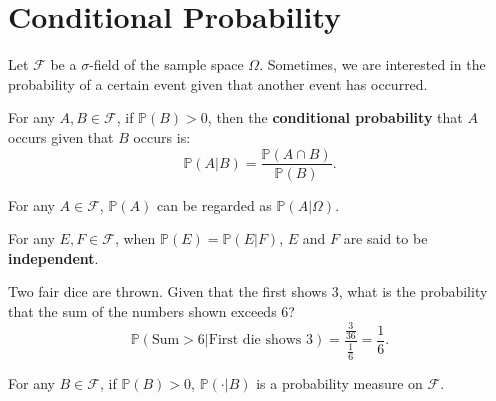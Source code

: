 \documentclass{huhtakm-template-book-v2}
\newcommand{\prob}{\mathbb{P}}
\begin{document}
\section{Conditional Probability}
    Let $\mathcal{F}$ be a $\sigma$-field of the sample space $\Omega$. Sometimes, we are interested in the probability of a certain event given that another event has occurred.
    \begin{defn}
        For any $A,B \in \mathcal{F}$, if $\prob(B) > 0$, then the \textbf{conditional probability} that $A$ occurs given that $B$ occurs is:
        \begin{equation*}
            \prob(A|B) = \frac{\prob(A\cap B)}{\prob(B)}.
        \end{equation*}
    \end{defn}
    \begin{rem}
        For any $A \in \mathcal{F}$, $\prob(A)$ can be regarded as $\prob(A|\Omega)$.
    \end{rem}
    \begin{rem}
        For any $E,F \in \mathcal{F}$, when $\prob(E) = \prob(E|F)$, $E$ and $F$ are said to be \textbf{independent}.
    \end{rem}
    \begin{eg}
        Two fair dice are thrown. Given that the first shows $3$, what is the probability that the sum of the numbers shown exceeds $6$?
        \begin{equation*}
            \prob(\text{Sum} > 6|\text{First die shows }3) = \frac{\frac{3}{36}}{\frac{1}{6}} = \frac{1}{6}.
        \end{equation*}
    \end{eg}
    \begin{lem}
        For any $B \in \mathcal{F}$, if $\prob(B) > 0$, $\prob(\cdot|B)$ is a probability measure on $\mathcal{F}$.
    \end{lem}
\end{document}
